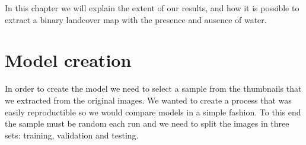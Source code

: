 In this chapter we will explain the extent of our results, and how it is possible to extract a binary landcover map with the presence and ausence of water.

\section{Model creation}

In order to create the model we need to select a sample from the thumbnails that we extracted from the original images. We wanted to create a process that was easily reproductible so we would compare models in a simple fashion. To this end the sample must be random each run and we need to split the images in three sets: training, validation and testing.


